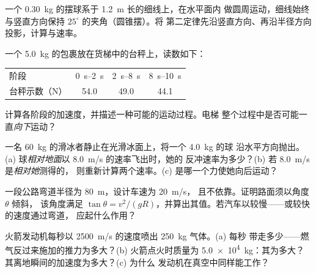 \begin{exercise}[$\star\star$]\label{exo:g12:newtons-laws:10}
一个 \qty{0.30}{kg} 的摆球系于 \qty{1.2}{m} 长的细线上，在水平面内
做圆周运动，细线始终与竖直方向保持 $25^\circ$ 的夹角（圆锥摆）。将
第二定律先沿竖直方向、再沿半径方向投影，计算与速率。
\end{exercise}

\begin{exercise}[$\star\star$]\label{exo:g12:newtons-laws:11}
一个 \qty{5.0}{kg} 的包裹放在货梯中的台秤上，读数如下：
\begin{center}\small\begin{tabular}{lccc}
阶段 & \qtyrange{0}{2}{s} & \qtyrange{2}{8}{s} & \qtyrange{8}{10}{s}\\
台秤示数（\unit{N}） & 54.0 & 49.0 & 44.1
\end{tabular}\end{center}
计算各阶段的加速度，并描述一种可能的运动过程。电梯
整个过程中是否可能一直\emph{向下}运动？
\end{exercise}

\begin{exercise}[$\star\star\star$]\label{exo:g12:newtons-laws:12}
一名 \qty{60}{kg} 的滑冰者静止在光滑冰面上，将一个 \qty{4.0}{kg} 的球
沿水平方向抛出。(a) 球\emph{相对地面}以 \qty{8.0}{m/s} 的速率飞出时，她的
反冲速率为多少？(b) 若 \qty{8.0}{m/s} 是\emph{相对她}测得的，
则重新计算两个速率。(c) 是哪一个力使她向后运动？
\end{exercise}

\begin{exercise}[$\star\star\star$]\label{exo:g12:newtons-laws:13}
一段公路弯道半径为 \qty{80}{m}，设计车速为 \qty{20}{m/s}，
且不依靠。证明路面须以角度 $\theta$ 倾斜，
该角度满足 $\tan\theta = v^2/(gR)$，并算出其值。若汽车以较慢——或较快的速度通过弯道，
应起什么作用？
\end{exercise}

\begin{exercise}[$\star\star\star$]\label{exo:g12:newtons-laws:14}
火箭发动机每秒以 \qty{2500}{m/s} 的速度喷出 \qty{250}{kg} 气体。(a) 每秒
带走多少——燃气反过来施加的推力为多大？(b) 火箭点火时质量为
\qty{5.0e4}{kg}：其为多大？其离地瞬间的加速度为多大？(c) 为什么
发动机在真空中同样能工作？
\end{exercise}

